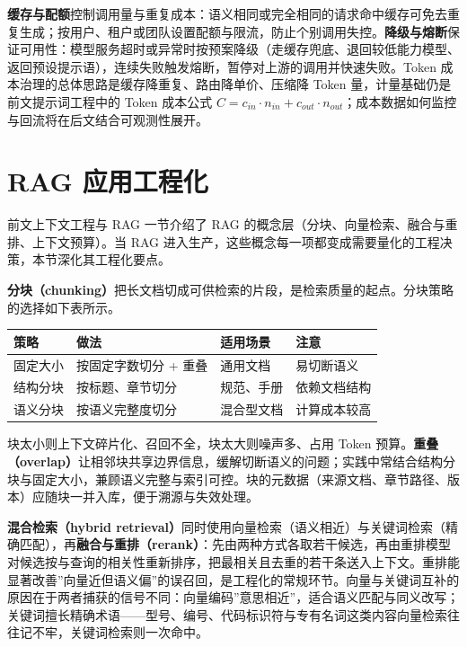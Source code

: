 \documentclass[
]{ctexbook}
\newcounter{none}
\begin{document}
\textbf{缓存与配额}控制调用量与重复成本：语义相同或完全相同的请求命中缓存可免去重复生成；按用户、租户或团队设置配额与限流，防止个别调用失控。\textbf{降级与熔断}保证可用性：模型服务超时或异常时按预案降级（走缓存兜底、退回较低能力模型、返回预设提示语），连续失败触发熔断，暂停对上游的调用并快速失败。Token
成本治理的总体思路是缓存降重复、路由降单价、压缩降 Token
量，计量基础仍是前文提示词工程中的 Token 成本公式
\(C=c_{in}\cdot n_{in}+c_{out}\cdot n_{out}\)；成本数据如何监控与回流将在后文结合可观测性展开。

\section{RAG 应用工程化}\label{rag-ux5e94ux7528ux5de5ux7a0bux5316}

前文上下文工程与 RAG 一节介绍了 RAG
的概念层（分块、向量检索、融合与重排、上下文预算）。当 RAG
进入生产，这些概念每一项都变成需要量化的工程决策，本节深化其工程化要点。

\textbf{分块（chunking）}把长文档切成可供检索的片段，是检索质量的起点。分块策略的选择如下表所示。

{\def\LTcaptype{none} %
\begin{longtable}[]{@{}llll@{}}
\toprule\noalign{}
策略 & 做法 & 适用场景 & 注意 \\
\midrule\noalign{}
\endhead
\bottomrule\noalign{}
\endlastfoot
固定大小 & 按固定字数切分 + 重叠 & 通用文档 & 易切断语义 \\
结构分块 & 按标题、章节切分 & 规范、手册 & 依赖文档结构 \\
语义分块 & 按语义完整度切分 & 混合型文档 & 计算成本较高 \\
\end{longtable}
}

块太小则上下文碎片化、召回不全，块太大则噪声多、占用 Token
预算。\textbf{重叠（overlap）}让相邻块共享边界信息，缓解切断语义的问题；实践中常结合结构分块与固定大小，兼顾语义完整与索引可控。块的元数据（来源文档、章节路径、版本）应随块一并入库，便于溯源与失效处理。

\textbf{混合检索（hybrid
retrieval）}同时使用向量检索（语义相近）与关键词检索（精确匹配），再\textbf{融合与重排（rerank）}：先由两种方式各取若干候选，再由重排模型对候选按与查询的相关性重新排序，把最相关且去重的若干条送入上下文。重排能显著改善''向量近但语义偏''的误召回，是工程化的常规环节。向量与关键词互补的原因在于两者捕获的信号不同：向量编码''意思相近''，适合语义匹配与同义改写；关键词擅长精确术语------型号、编号、代码标识符与专有名词这类内容向量检索往往记不牢，关键词检索则一次命中。
\end{document}
